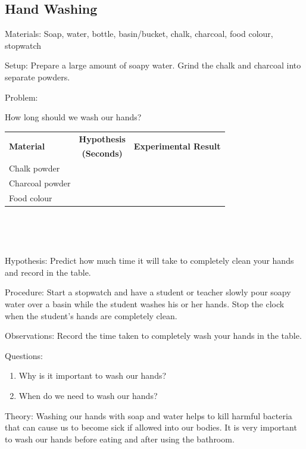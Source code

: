 \subsection{Hand Washing} 


\begin{description*}
\item[Materials:]{Soap, water, bottle, basin/bucket, chalk, charcoal, food colour, stopwatch}
\item[Setup:]{Prepare a large amount of soapy water. Grind the chalk and charcoal into separate powders.}\\
\item[Problem:]{How long should we wash our hands?\\

\begin{tabular}{|l|c|c|} \hline
\multirow{2}{*}{\textbf{Material}} & \textbf{Hypothesis} & \multirow{2}{*}{\textbf{Experimental Result}} \\
& \textbf{(Seconds)} & \\ \hline
Chalk powder & & \\ \hline
Charcoal powder & & \\ \hline
Food colour & & \\ \hline
\end{tabular} \\[10pt]
}\\
\item[Hypothesis:]{Predict how much time it will take to completely clean your hands and record in the table.}
\item[Procedure:]{Start a stopwatch and have a student or teacher slowly pour soapy water over a basin while the student washes his or her hands. Stop the clock when the student's hands are completely clean.}
\item[Observations:]{Record the time taken to completely wash your hands in the table.}
\item[Questions:]{}\hfill
\begin{enumerate}
\item Why is it important to wash our hands?
\item When do we need to wash our hands?
\end{enumerate}
\item[Theory:]{Washing our hands with soap and water helps to kill harmful bacteria that can cause us to become sick if allowed into our bodies. It is very important to wash our hands before eating and after using the bathroom.}
\end{description*}

